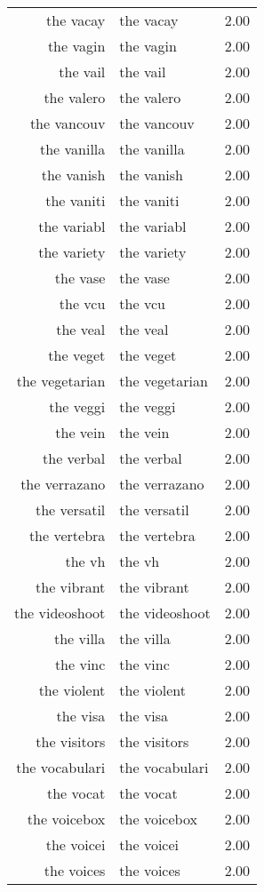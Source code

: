 \begin{table}[ht]
\begin{tabular}{rlr}
  the vacay & the vacay & 2.00 \\ 
  the vagin & the vagin & 2.00 \\ 
  the vail & the vail & 2.00 \\ 
  the valero & the valero & 2.00 \\ 
  the vancouv & the vancouv & 2.00 \\ 
  the vanilla & the vanilla & 2.00 \\ 
  the vanish & the vanish & 2.00 \\ 
  the vaniti & the vaniti & 2.00 \\ 
  the variabl & the variabl & 2.00 \\ 
  the variety & the variety & 2.00 \\ 
  the vase & the vase & 2.00 \\ 
  the vcu & the vcu & 2.00 \\ 
  the veal & the veal & 2.00 \\ 
  the veget & the veget & 2.00 \\ 
  the vegetarian & the vegetarian & 2.00 \\ 
  the veggi & the veggi & 2.00 \\ 
  the vein & the vein & 2.00 \\ 
  the verbal & the verbal & 2.00 \\ 
  the verrazano & the verrazano & 2.00 \\ 
  the versatil & the versatil & 2.00 \\ 
  the vertebra & the vertebra & 2.00 \\ 
  the vh & the vh & 2.00 \\ 
  the vibrant & the vibrant & 2.00 \\ 
  the videoshoot & the videoshoot & 2.00 \\ 
  the villa & the villa & 2.00 \\ 
  the vinc & the vinc & 2.00 \\ 
  the violent & the violent & 2.00 \\ 
  the visa & the visa & 2.00 \\ 
  the visitors & the visitors & 2.00 \\ 
  the vocabulari & the vocabulari & 2.00 \\ 
  the vocat & the vocat & 2.00 \\ 
  the voicebox & the voicebox & 2.00 \\ 
  the voicei & the voicei & 2.00 \\ 
  the voices & the voices & 2.00 \\ 

\end{tabular}
\end{table}
